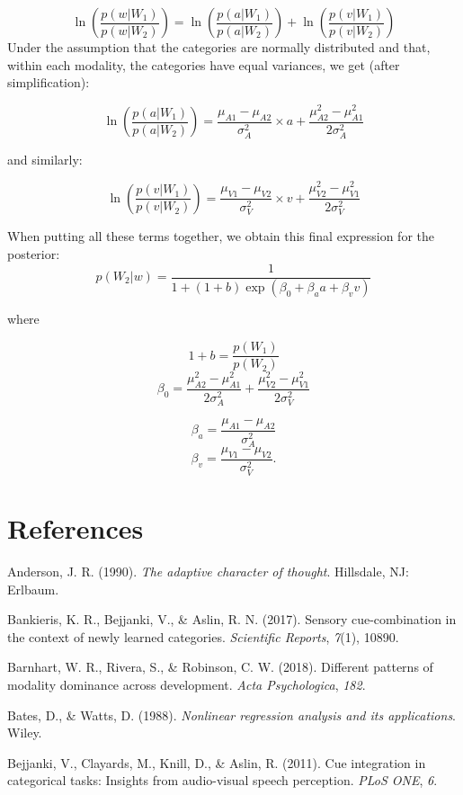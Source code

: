 \documentclass[english,,man,floatsintext]{apa6}
\theoremstyle{definition}
\theoremstyle{definition}
\theoremstyle{definition}
\theoremstyle{remark}
\begin{document}
\[ \ln(\frac{p(w |W_1)}{p(w|W_2)})=\ln(\frac{p(a|W_1)}{p(a|W_2)})+\ln(\frac{p(v|W_1)}{p(v|W_2)}) \]
Under the assumption that the categories are normally distributed and
that, within each modality, the categories have equal variances, we get
(after simplification):

\[\ln(\frac{p(a|W_1)}{p(a|W_2)})=\frac{\mu_{A1}-\mu_{A2}}{\sigma^2_{A}}\times a+ \frac{\mu^2_{A2}-\mu^2_{A1}}{2\sigma^2_{A}}\]

and similarly:

\[\ln(\frac{p(v|W_1)}{p(v|W_2)})=\frac{\mu_{V1}-\mu_{V2}}{\sigma^2_{V}}\times v+ \frac{\mu^2_{V2}-\mu^2_{V1}}{2\sigma^2_{V}}\]

When putting all these terms together, we obtain this final expression
for the posterior:
\[p(W_2 | w)=\frac{1}{1+(1+b)\exp(\beta_0+\beta_aa+\beta_vv)}\]

where

\[1+b=\frac{p(W_1)}{p(W_2)}\]
\[\beta_0=\frac{\mu^2_{A2}-\mu^2_{A1}}{2\sigma^2_{A}}+\frac{\mu^2_{V2}-\mu^2_{V1}}{2\sigma^2_{V}}\]

\[\beta_a=\frac{\mu_{A1}-\mu_{A2}}{\sigma^2_{A}}\]
\[\beta_v=\frac{\mu_{V1}-\mu_{V2}}{\sigma^2_{V}}.\]

\section{References}\label{references}

\setlength{\parindent}{-0.5in} \setlength{\leftskip}{0.5in}

\hypertarget{refs}{}
\hypertarget{ref-anderson90}{}
Anderson, J. R. (1990). \emph{The adaptive character of thought}.
Hillsdale, NJ: Erlbaum.

\hypertarget{ref-Bankieris17}{}
Bankieris, K. R., Bejjanki, V., \& Aslin, R. N. (2017). Sensory
cue-combination in the context of newly learned categories.
\emph{Scientific Reports}, \emph{7}(1), 10890.

\hypertarget{ref-barnhart2018}{}
Barnhart, W. R., Rivera, S., \& Robinson, C. W. (2018). Different
patterns of modality dominance across development. \emph{Acta
Psychologica}, \emph{182}.

\hypertarget{ref-bates88}{}
Bates, D., \& Watts, D. (1988). \emph{Nonlinear regression analysis and
its applications}. Wiley.

\hypertarget{ref-bejjanki2011}{}
Bejjanki, V., Clayards, M., Knill, D., \& Aslin, R. (2011). Cue
integration in categorical tasks: Insights from audio-visual speech
perception. \emph{PLoS ONE}, \emph{6}.
\end{document}
